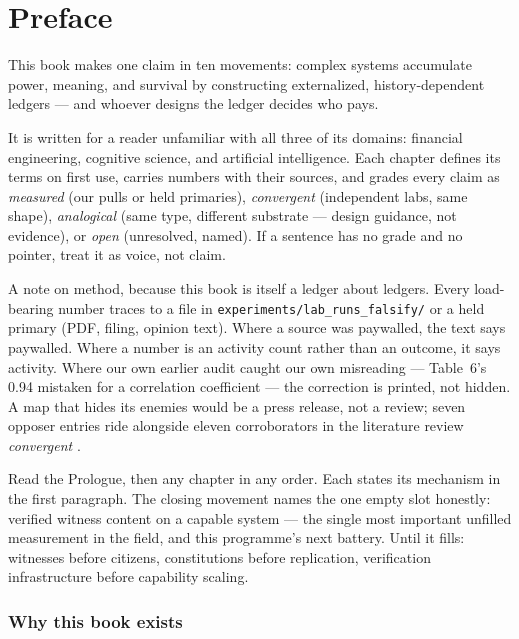 \chapter*{Preface}

This book makes one claim in ten movements: complex systems accumulate power, meaning, and survival by constructing externalized, history-dependent ledgers --- and whoever designs the ledger decides who pays.

It is written for a reader unfamiliar with all three of its domains: financial engineering, cognitive science, and artificial intelligence. Each chapter defines its terms on first use, carries numbers with their sources, and grades every claim as \textit{measured} (our pulls or held primaries), \textit{convergent} (independent labs, same shape), \textit{analogical} (same type, different substrate --- design guidance, not evidence), or \textit{open} (unresolved, named). If a sentence has no grade and no pointer, treat it as voice, not claim.

A note on method, because this book is itself a ledger about ledgers. Every load-bearing number traces to a file in \texttt{experiments/lab\_runs\_falsify/} or a held primary (PDF, filing, opinion text). Where a source was paywalled, the text says paywalled. Where a number is an activity count rather than an outcome, it says activity. Where our own earlier audit caught our own misreading --- Table~6's 0.94 mistaken for a correlation coefficient --- the correction is printed, not hidden. A map that hides its enemies would be a press release, not a review; seven opposer entries ride alongside eleven corroborators in the literature review \textit{convergent} \citep{henrich}.

Read the Prologue, then any chapter in any order. Each states its mechanism in the first paragraph. The closing movement names the one empty slot honestly: verified witness content on a capable system --- the single most important unfilled measurement in the field, and this programme's next battery. Until it fills: witnesses before citizens, constitutions before replication, verification infrastructure before capability scaling.

\subsection*{Why this book exists}

